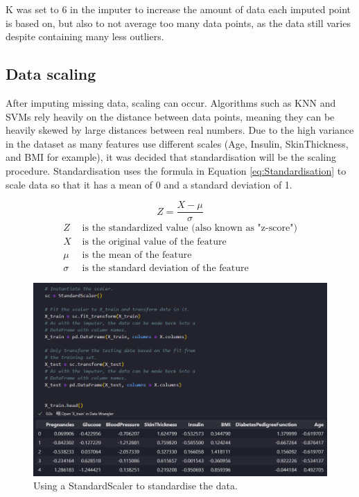 \documentclass[12pt]{report}
\newcommand{\para}{\vspace{8pt}\noindent}
\begin{document}
\para K was set to 6 in the imputer to increase the amount of data each imputed point is based on, but also to not average 
too many data points, as the data still varies despite containing many less outliers. 

\subsection{Data scaling}
After imputing missing data, scaling can occur. Algorithms such as KNN and SVMs rely heavily on the distance 
between data points, meaning they can be heavily skewed by large distances between real numbers. Due to the high 
variance in the dataset as many features use different scales (Age, Insulin, SkinThickness, and BMI for example), 
it was decided that standardisation will be the scaling procedure. Standardisation uses the formula in Equation \ref{eq:Standardisation}
to scale data so that it has a mean of 0 and a standard deviation of 1.

\begin{equation}\label{eq:Standardisation}
    Z = \frac{X - \mu}{\sigma}
\end{equation}
\begin{align*}
    Z & \text{ is the standardized value (also known as "z-score")} \\
    X & \text{ is the original value of the feature} \\
    \mu & \text{ is the mean of the feature} \\
    \sigma & \text{ is the standard deviation of the feature}
\end{align*}

\begin{figure}[H]
    \centering
    \includegraphics[width=\linewidth]{Preprocessing/Standardisation.png}
    \caption{Using a StandardScaler to standardise the data.}
    \label{fig:Standardisation}
\end{figure}
\end{document}

